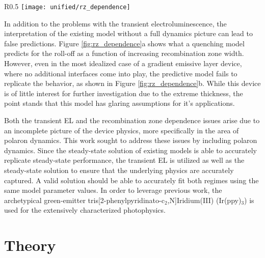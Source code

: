 \documentclass[../thesis.tex]{subfiles}
\begin{document}
\begin{wrapfigure}{R}{0.5\textwidth}
\centering
\texttt{[image: unified/rz\_dependence]}
\caption{(a) Efficiency roll-off predicted by Erickson \textit{et al.} 2014 as a function of recombination zone width.\cite{Erickson2014} (b) Observed efficiency roll-off for gradient EML devices.}
\label{fig:rz_dependence}
\end{wrapfigure}

In addition to the problems with the transient electroluminescence, the interpretation of the existing model without a full dynamics picture can lead to false predictions.  
Figure \ref{fig:rz_dependence}a shows what a quenching model predicts for the roll-off as a function of increasing recombination zone width.\cite{Erickson2014}
However, even in the most idealized case of a gradient emissive layer device, where no additional interfaces come into play, the predictive model fails to replicate the behavior, as shown in Figure \ref{fig:rz_dependence}b.
While this device is of little interest for further investigation due to the extreme thickness, the point stands that this model has glaring assumptions for it's applications.

Both the transient EL and the recombination zone dependence issues arise due to an incomplete picture of the device physics, more specifically in the area of polaron dynamics.  
This work sought to address these issues by including polaron dynamics.  
Since the steady-state solution of existing models is able to accurately replicate steady-state performance, the transient EL is utilized as well as the steady-state solution to ensure that the underlying physics are accurately captured.
A valid solution should be able to accurately fit both regimes using the same model parameter values.
In order to leverage previous work, the archetypical green-emitter tris[2-phenylpyridinato-c$_2$,N]Iridium(III) (Ir(ppy)$_3$) is used for the extensively characterized photophysics.\cite{Baldo2000,Baldo2000a,Tsuboi2006,Adachi2001a,Kawamura2006,Kawamura2005c}

\section{Theory}
\end{document}
